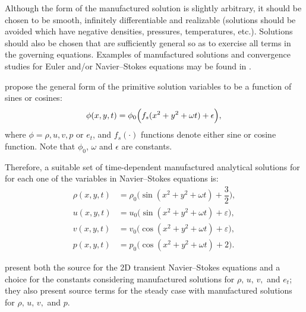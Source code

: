 \documentclass[10pt]{article}
\begin{document}
Although the form of the manufactured solution is slightly arbitrary, it should be chosen to be smooth, infinitely differentiable and realizable (solutions should be avoided which have negative densities, pressures, temperatures, etc.)\citep{Salari_Knupp_2000,Roy2004}. Solutions should also be chosen that are sufficiently general so as to exercise all terms in the governing equations. Examples of manufactured solutions and convergence studies for Euler and/or Navier--Stokes equations may be found in \citet{Salari_Knupp_2000,Roy2002,Roy2004,Bond2007,Orozco2010}.

\citet{Salari_Knupp_2000} propose the general form of the primitive solution variables to be  a function of sines or cosines:
\begin{equation}
 \label{eq:manufactured01}
  \phi (x,y,t) = \phi_{0} \Big( f_s(x^2+y^2+\omega t) + \epsilon\Big) ,\\
\end{equation}
where $\phi=\rho,u,v, p$ or $e_t$, and $f_s(\cdot)$ functions denote either sine or cosine function. Note that $\phi_0$, $\omega$ and $\epsilon$ are constants.

Therefore, a suitable set of time-dependent manufactured analytical solutions for for each one of the variables in Navier--Stokes equations is:
\begin{equation}
\begin{split}
\label{eq:manufactured02}
\rho(x,y,t) &=  \rho_{0} \Big( \sin(x^2+y^2+\omega t) + \dfrac{3}{2}\Big) ,\\
u(x,y,t) &= u_{0} \Big( \sin(x^2+y^2+\omega t) + \varepsilon \Big) ,\\
v(x,y,t) &= v_{0} \Big( \cos(x^2+y^2+\omega t) + \varepsilon \Big) ,\\
p(x,y,t) &= p_{0} \Big( \cos(x^2+y^2+\omega t) + 2\Big) .
\end{split}
\end{equation}





\citet{Salari_Knupp_2000} present both the source for the 2D transient Navier--Stokes equations and a choice for the constants considering manufactured solutions for  $\rho,\,u,\,v,$ and $e_t$; they also present source terms for the steady case with manufactured solutions for  $\rho,\,u,\,v,$ and $p$. 

\end{document}
